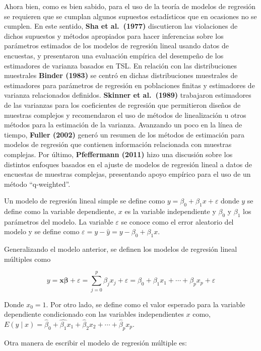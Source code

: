 \documentclass[
  12pt,
]{book}
\begin{document}
Ahora bien, como es bien sabido, para el uso de la teoría de modelos de regresión se requieren que se cumplan algunos supuestos estadísticos que en ocasiones no se cumplen. En este sentido, \textbf{Sha et al.~(1977)} discutieron las violaciones de dichos supuestos y métodos apropiados para hacer inferencias sobre los parámetros estimados de los modelos de regresión lineal usando datos de encuestas, y presentaron una evaluación empírica del desempeño de los estimadores de varianza basados en TSL. En relación con las distribuciones muestrales \textbf{Binder (1983)} se centró en dichas distribuciones muestrales de estimadores para parámetros de regresión en poblaciones finitas y estimadores de varianza relacionados definidos. \textbf{Skinner et al.~(1989)} trabajaron estimadores de las varianzas para los coeficientes de regresión que permitieron diseños de muestras complejos y recomendaron el uso de métodos de linealización u otros métodos para la estimación de la varianza. Avanzando un poco en la línea de tiempo, \textbf{Fuller (2002)} generó un resumen de los métodos de estimación para modelos de regresión que contienen información relacionada con muestras complejas. Por último, \textbf{Pfeffermann (2011)} hizo una discusión sobre los distintos enfoques basados en el ajuste de modelos de regresión lineal a datos de encuestas de muestras complejas, presentando apoyo empírico para el uso de un método ``q-weighted''.

Un modelo de regresión lineal simple se define como \(y=\beta_{0}+\beta_{1}x+\varepsilon\) donde \(y\) se define como la variable dependiente, \(x\) es la variable independiente y \(\beta_{0}\) y \(\beta_{1}\) los parámetros del modelo. La variable \(\varepsilon\) se conoce como el error aleatorio del modelo y se define como \(\varepsilon=y-\hat{y}=y-\beta_{0}+\beta_{1}x\).

Generalizando el modelo anterior, se definen los modelos de regresión lineal múltiples como

\[
y  =  \boldsymbol{x}\boldsymbol{\beta}+\varepsilon
  =  \sum_{j=0}^{p}\beta_{j}x_{j}+\varepsilon
 =  \beta_{0}+\beta_{1}x_{1}+\cdots+\beta_{p}x_{p}+\varepsilon
\]

Donde \(x_{0}=1\). Por otro lado, se define como el valor esperado para la variable dependiente condicionado con las variables independientes \(x\) como, \(E\left(y\mid x\right)=\hat{\beta}_{0}+\hat{\beta_{1}}x_{1}+\hat{\beta}_{2}x_{2}+\cdots+\hat{\beta}_{p}x_{p}\).

Otra manera de escribir el modelo de regresión múltiple es:
\end{document}
